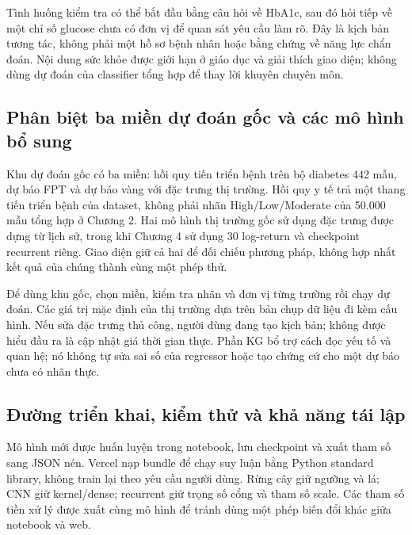 Tình huống kiểm tra có thể bắt đầu bằng câu hỏi về HbA1c, sau đó hỏi
tiếp về một chỉ số glucose chưa có đơn vị để quan sát yêu cầu làm rõ.
Đây là kịch bản tương tác, không phải một hồ sơ bệnh nhân hoặc bằng
chứng về năng lực chẩn đoán. Nội dung sức khỏe được giới hạn ở giáo dục
và giải thích giao diện; không dùng dự đoán của classifier tổng hợp để
thay lời khuyên chuyên môn.


\subsection{Phân biệt ba miền dự đoán gốc và các mô hình bổ sung}\label{phuxe2n-biux1ec7t-ba-miux1ec1n-dux1ef1-ux111ouxe1n-gux1ed1c-vuxe0-cuxe1c-muxf4-huxecnh-bux1ed5-sung}

Khu dự đoán gốc có ba miền: hồi quy tiến triển bệnh trên bộ diabetes 442
mẫu, dự báo FPT và dự báo vàng với đặc trưng thị trường. Hồi quy y tế
trả một thang tiến triển bệnh của dataset, không phải nhãn
High/Low/Moderate của 50.000 mẫu tổng hợp ở Chương 2. Hai mô hình thị
trường gốc sử dụng đặc trưng được dựng từ lịch sử, trong khi Chương 4 sử
dụng 30 log-return và checkpoint recurrent riêng. Giao diện giữ cả hai
để đối chiếu phương pháp, không hợp nhất kết quả của chúng thành cùng
một phép thử.

Để dùng khu gốc, chọn miền, kiểm tra nhãn và đơn vị từng trường rồi chạy
dự đoán. Các giá trị mặc định của thị trường dựa trên bản chụp dữ liệu đi kèm
cấu hình. Nếu sửa đặc trưng thủ công, người dùng đang tạo kịch bản;
không được hiểu đầu ra là cập nhật giá thời gian thực. Phần KG bổ trợ
cách đọc yếu tố và quan hệ; nó không tự sửa sai số của regressor hoặc
tạo chứng cứ cho một dự báo chưa có nhãn thực.


\subsection{Đường triển khai, kiểm thử và khả năng tái lập}\label{ux111ux1b0ux1eddng-triux1ec3n-khai-kiux1ec3m-thux1eed-vuxe0-khux1ea3-nux103ng-tuxe1i-lux1eadp}

Mô hình mới được huấn luyện trong notebook, lưu checkpoint và xuất tham
số sang JSON nén. Vercel nạp bundle để chạy suy luận bằng Python
standard library, không train lại theo yêu cầu người dùng. Rừng cây giữ
ngưỡng và lá; CNN giữ kernel/dense; recurrent giữ trọng số cổng và tham
số scale. Các tham số tiền xử lý được xuất cùng mô hình để tránh dùng
một phép biến đổi khác giữa notebook và web.

